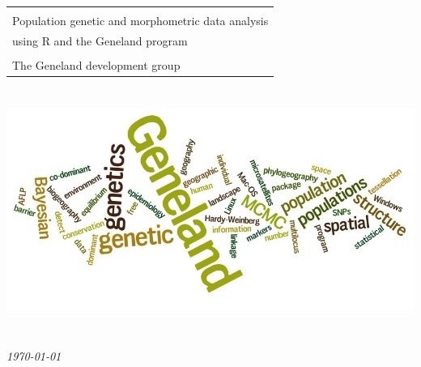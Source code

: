\documentclass{article}
\begin{document}




\thispagestyle{empty}
\setlength{\arrayrulewidth}{3pt}
\phantom{m}

\vspace{3cm}\begin{center}
\begin{tabular}{l}
\hline
\\
{\Huge \sf Population genetic and morphometric data analysis }\\
{\Huge \sf using R and the {\sc Geneland} program }\\
\\
{\huge \sf The Geneland development group}
\\
\hline
\end{tabular}
\end{center}

\vspace{3cm}


\includegraphics[height=8cm]{../inst/images/wdl1.jpeg}

\vspace{4cm}


\hspace{8cm} {\huge \em \today{}} \\


\setlength{\arrayrulewidth}{.5pt}
\newpage



\tableofcontents

\newpage


\end{document}
